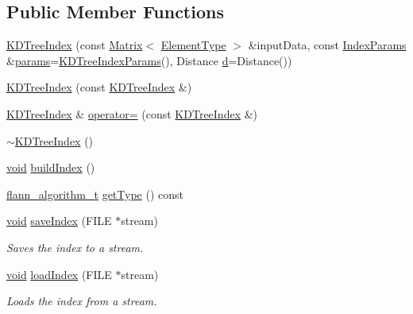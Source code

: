 \subsection*{Public Member Functions}
\begin{DoxyCompactItemize}
\item 
\hyperlink{classcvflann_1_1KDTreeIndex_ab34211371a9b8731626dafeab2a3d4b8}{K\-D\-Tree\-Index} (const \hyperlink{classcvflann_1_1Matrix}{Matrix}$<$ \hyperlink{classcvflann_1_1KDTreeIndex_a200ee43145794ee028f415f205934d24}{Element\-Type} $>$ \&input\-Data, const \hyperlink{namespacecvflann_a742b4c7076c21012054af74a9ee48289}{Index\-Params} \&\hyperlink{compat_8hpp_a0480a03ecc41b20cde376602531d9270}{params}=\hyperlink{structcvflann_1_1KDTreeIndexParams}{K\-D\-Tree\-Index\-Params}(), Distance \hyperlink{legacy_8hpp_a6f364afbe132c4ecfea48bde1b0618ba}{d}=Distance())
\item 
\hyperlink{classcvflann_1_1KDTreeIndex_ae67afef23555988e9650c0f11740df0a}{K\-D\-Tree\-Index} (const \hyperlink{classcvflann_1_1KDTreeIndex}{K\-D\-Tree\-Index} \&)
\item 
\hyperlink{classcvflann_1_1KDTreeIndex}{K\-D\-Tree\-Index} \& \hyperlink{classcvflann_1_1KDTreeIndex_ab8fcfe6f0b0fbb2251d5ec220692b77f}{operator=} (const \hyperlink{classcvflann_1_1KDTreeIndex}{K\-D\-Tree\-Index} \&)
\item 
\hyperlink{classcvflann_1_1KDTreeIndex_a4008c75a6da374a57fb6830d65dbc44a}{$\sim$\-K\-D\-Tree\-Index} ()
\item 
\hyperlink{legacy_8hpp_a8bb47f092d473522721002c86c13b94e}{void} \hyperlink{classcvflann_1_1KDTreeIndex_aa5e5a2618d59b26870fea3cc5091d91f}{build\-Index} ()
\item 
\hyperlink{namespacecvflann_a4e3e6c98d774ea77fd7f0045c9bc7817}{flann\-\_\-algorithm\-\_\-t} \hyperlink{classcvflann_1_1KDTreeIndex_aeebbf47bdbc4a9155bb98316c75f470f}{get\-Type} () const 
\item 
\hyperlink{legacy_8hpp_a8bb47f092d473522721002c86c13b94e}{void} \hyperlink{classcvflann_1_1KDTreeIndex_a623752bde2c481c8c7bc2c88a702c481}{save\-Index} (F\-I\-L\-E $\ast$stream)
\begin{DoxyCompactList}\small\item\em Saves the index to a stream. \end{DoxyCompactList}\item 
\hyperlink{legacy_8hpp_a8bb47f092d473522721002c86c13b94e}{void} \hyperlink{classcvflann_1_1KDTreeIndex_a2076c89754589df49d24b5d0fa886afc}{load\-Index} (F\-I\-L\-E $\ast$stream)
\begin{DoxyCompactList}\small\item\em Loads the index from a stream. \end{DoxyCompactList}\item 

\end{DoxyCompactItemize}
